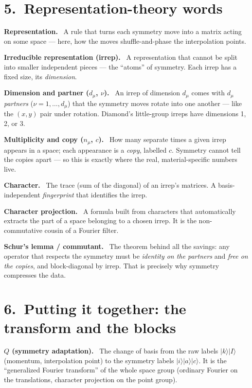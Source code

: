 \documentclass[11pt]{article}
\newcommand{\term}[1]{\medskip\noindent\textbf{#1.}\ }
\begin{document}
\section*{5.\ Representation-theory words}

\term{Representation} A rule that turns each symmetry move into a matrix acting on some space --- here,
how the moves shuffle-and-phase the interpolation points.

\term{Irreducible representation (irrep)} A representation that cannot be split into smaller
independent pieces --- the ``atoms'' of symmetry. Each irrep has a fixed size, its \emph{dimension}.

\term{Dimension and partner ($d_\mu$, $\nu$)} An irrep of dimension $d_\mu$ comes with $d_\mu$
\emph{partners} ($\nu=1,\dots,d_\mu$) that the symmetry moves rotate into one another --- like the
$(x,y)$ pair under rotation. Diamond's little-group irreps have dimensions 1, 2, or 3.

\term{Multiplicity and copy ($n_\mu$, $c$)} How many separate times a given irrep appears in a space;
each appearance is a \emph{copy}, labelled $c$. Symmetry cannot tell the copies apart --- so this is
exactly where the real, material-specific numbers live.

\term{Character} The trace (sum of the diagonal) of an irrep's matrices. A basis-independent
\emph{fingerprint} that identifies the irrep.

\term{Character projection} A formula built from characters that automatically extracts the part of a
space belonging to a chosen irrep. It is the non-commutative cousin of a Fourier filter.

\term{Schur's lemma / commutant} The theorem behind all the savings: any operator that respects the
symmetry must be \emph{identity on the partners} and \emph{free on the copies}, and block-diagonal by
irrep. That is precisely why symmetry compresses the data.

\section*{6.\ Putting it together: the transform and the blocks}

\term{$Q$ (symmetry adaptation)} The change of basis from the raw labels
$|k\rangle|I\rangle$ (momentum, interpolation point) to the symmetry labels
$|i\rangle|a\rangle|c\rangle$. It is the ``generalized Fourier transform'' of the whole space group
(ordinary Fourier on the translations, character projection on the point group).
\end{document}
